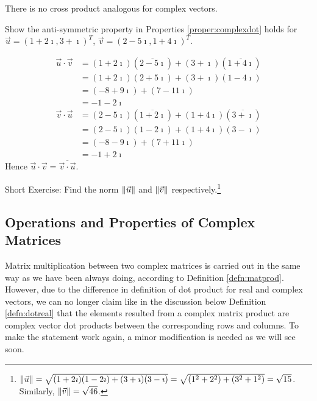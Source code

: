There is no cross product analogous for complex vectors.
\begin{exmp}
Show the anti-symmetric property in Properties \ref{proper:complexdot} holds for $\vec{u} = (1+2\imath, 3+\imath)^T$, $\vec{v} = (2-5\imath, 1+4\imath)^T$.
\end{exmp}
\begin{solution}
\begin{align*}
\vec{u} \cdot \vec{v} &= (1+2\imath)(\overline{2-5\imath}) + (3+\imath)(\overline{1+4\imath}) \\
&= (1+2\imath)(2+5\imath) + (3+\imath)(1-4\imath) \\
&= (-8+9\imath) + (7-11\imath) \\
&= -1-2\imath 
\end{align*}
\begin{align*}
\vec{v} \cdot \vec{u} &= (2-5\imath)(\overline{1+2\imath}) + (1+4\imath)(\overline{3+\imath}) \\
&= (2-5\imath)(1-2\imath) + (1+4\imath)(3-\imath) \\
&= (-8-9\imath) + (7+11\imath) \\
&= -1+2\imath 
\end{align*}
Hence $\vec{u} \cdot \vec{v} = \overline{\vec{v} \cdot \vec{u}}$.
\end{solution}

Short Exercise: Find the norm $\norm{\vec{u}}$ and $\norm{\vec{v}}$ respectively.\footnote{$\norm{\vec{u}} = \sqrt{(1+2\imath)(1-2\imath) + (3+\imath)(3-\imath)} = \sqrt{(1^2 + 2^2) + (3^2 + 1^2)} = \sqrt{15}$. Similarly, $\norm{\vec{v}} = \sqrt{46}$.}

\subsection{Operations and Properties of Complex Matrices}
Matrix multiplication between two complex matrices is carried out in the same way as we have been always doing, according to Definition \ref{defn:matprod}. However, due to the difference in definition of dot product for real and complex vectors, we can no longer claim like in the discussion below Definition \ref{defn:dotreal} that the elements resulted from a complex matrix product are complex vector dot products between the corresponding rows and columns. To make the statement work again, a minor modification is needed as we will see soon. 

